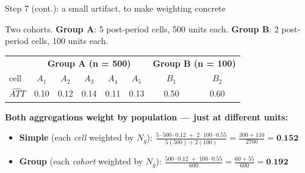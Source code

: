 \documentclass[aspectratio=169,12pt,t]{beamer}
\begin{document}
\begin{frame}{Step 7 (cont.): a small artifact, to make weighting concrete}
\vspace{0.1cm}

Two cohorts. \;\textbf{Group A}: 5 post-period cells, 500 units each. \;\textbf{Group B}: 2 post-period cells, 100 units each.

\vspace{0.2cm}
\begin{center}
\scriptsize
\setlength{\tabcolsep}{8pt}
\renewcommand{\arraystretch}{1.05}
\begin{tabular}{l|ccccc|cc}
\toprule
                  & \multicolumn{5}{c|}{\textbf{Group A (n = 500)}} & \multicolumn{2}{c}{\textbf{Group B (n = 100)}} \\
cell        & $A_1$ & $A_2$ & $A_3$ & $A_4$ & $A_5$              & $B_1$ & $B_2$ \\
\midrule
$\widehat{ATT}$   & 0.10 & 0.12 & 0.14 & 0.11 & 0.13                 & 0.50 & 0.60 \\
\bottomrule
\end{tabular}
\end{center}

\vspace{0.2cm}
\textbf{Both aggregations weight by population --- just at different units:}
\begin{itemize}\small\setlength\itemsep{0pt}
  \item \textbf{Simple} (each \textit{cell} weighted by $N_g$): \;$\frac{5\cdot 500 \cdot 0.12 \;+\; 2 \cdot 100 \cdot 0.55}{5(500) + 2(100)} = \frac{300 + 110}{2700} = \textbf{0.152}$
  \item \textbf{Group} (each \textit{cohort} weighted by $N_g$): \;$\frac{500\cdot 0.12 \;+\; 100\cdot 0.55}{600} = \frac{60 + 55}{600} = \textbf{0.192}$
\end{itemize}

\vspace{0.05em}
\end{frame}

\end{document}
